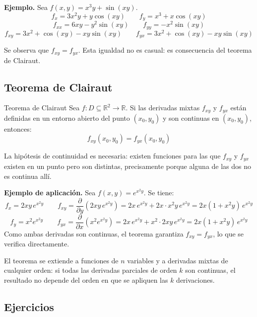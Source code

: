 \textbf{Ejemplo.} Sea $f(x, y) = x^3 y + \sin(xy)$.
\[
f_x = 3x^2 y + y\cos(xy) \qquad f_y = x^3 + x\cos(xy)
\]
\[
f_{xx} = 6xy - y^2\sin(xy) \qquad f_{yy} = -x^2\sin(xy)
\]
\[
f_{xy} = 3x^2 + \cos(xy) - xy\sin(xy) \qquad f_{yx} = 3x^2 + \cos(xy) - xy\sin(xy)
\]

Se observa que $f_{xy} = f_{yx}$. Esta igualdad no es casual: es consecuencia del teorema de Clairaut.

\subsection{Teorema de Clairaut}

\begin{mytheorem}{Teorema de Clairaut}
Sea $f: D \subseteq \mathbb{R}^2 \to \mathbb{R}$. Si las derivadas mixtas $f_{xy}$ y $f_{yx}$ están definidas en un entorno abierto del punto $(x_0, y_0)$ y son continuas en $(x_0, y_0)$, entonces:
\[
f_{xy}(x_0, y_0) = f_{yx}(x_0, y_0)
\]
\end{mytheorem}

La hipótesis de continuidad es necesaria: existen funciones para las que $f_{xy}$ y $f_{yx}$ existen en un punto pero son distintas, precisamente porque alguna de las dos no es continua allí.

\textbf{Ejemplo de aplicación.} Sea $f(x, y) = e^{x^2 y}$. Se tiene:
\[
f_x = 2xy\, e^{x^2 y} \qquad f_{xy} = \frac{\partial}{\partial y}(2xy\, e^{x^2 y}) = 2x\, e^{x^2 y} + 2x \cdot x^2 y\, e^{x^2 y} = 2x(1 + x^2 y)\,e^{x^2 y}
\]
\[
f_y = x^2 e^{x^2 y} \qquad f_{yx} = \frac{\partial}{\partial x}(x^2 e^{x^2 y}) = 2x\,e^{x^2 y} + x^2 \cdot 2xy\,e^{x^2 y} = 2x(1 + x^2 y)\,e^{x^2 y}
\]
Como ambas derivadas son continuas, el teorema garantiza $f_{xy} = f_{yx}$, lo que se verifica directamente.

El teorema se extiende a funciones de $n$ variables y a derivadas mixtas de cualquier orden: si todas las derivadas parciales de orden $k$ son continuas, el resultado no depende del orden en que se apliquen las $k$ derivaciones.

\subsection{Ejercicios}

